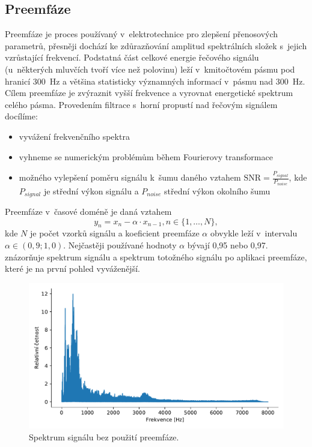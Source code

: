 \subsection{Preemfáze}
Preemfáze je proces používaný v~elektrotechnice pro zlepšení přenosových parametrů, přesněji dochází ke zdůrazňování amplitud spektrálních složek s~jejich vzrůstající frekvencí.
Podstatná část celkové energie řečového signálu (u~některých mluvčích tvoří více než polovinu) leží v~kmitočtovém pásmu pod hranicí 300~Hz a většina statisticky významných informací v~pásmu nad 300~Hz. Cílem preemfáze je zvýraznit vyšší frekvence a vyrovnat energetické spektrum celého pásma. Provedením filtrace s~horní propustí nad řečovým signálem docílíme:
\begin{itemize}
    \item vyvážení frekvenčního spektra
    \item vyhneme se numerickým problémům během Fourierovy transformace
    \item možného vylepšení poměru signálu k~šumu daného vztahem $
\mathrm{SNR} = \frac{P_{signal}}{P_{noise}}
$, kde $P_{signal}$ je střední výkon signálu a $P_{noise}$ střední výkon okolního šumu
\end{itemize}

Preemfáze v~časové doméně je daná vztahem
\begin{equation}
\label{eqn:Preemphasis}
    y_{n}= x_{n} - \alpha \cdot x_{n - 1}, n \in \{1, \dots, N \},
\end{equation}
kde $N$ je počet vzorků signálu a koeficient preemfáze $\alpha$ obvykle leží v~intervalu $\alpha \in (0,9;1,0)$. Nejčastěji používané hodnoty $\alpha$ bývají 0,95 nebo 0,97.  znázorňuje spektrum signálu a  spektrum totožného signálu po aplikaci preemfáze, které je na první pohled vyváženější.

\begin{figure}[ht]
  \centering
  \includegraphics[width=\linewidth]{obrazky-figures/signal_spectrum.pdf}
  \caption{Spektrum signálu bez použití preemfáze.}
  \label{fig:Signal_without_preemphasis}
\end{figure}

